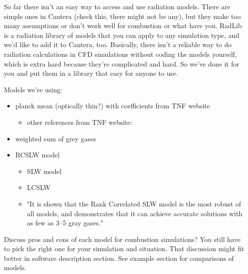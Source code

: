 \documentclass[preprint,12pt, a4paper]{elsarticle}
\begin{document}
So far there isn't an easy way to access and use radiation models. There are simple ones in Cantera (check this, there might not be any), but they make too many assumptions or don't work well for combustion or what have you. RadLib is a radiation library of models that you can apply to any simulation type, and we'd like to add it to Cantera, too. Basically, there isn't a reliable way to do radiation calculations in CFD simulations without coding the models yourself, which is extra hard because they're complicated and hard. So we've done it for you and put them in a library that easy for anyone to use.

Models we're using:
\begin{itemize}
 \item planck mean (optically thin?) with coefficients from TNF website \cite{Smith_2003}
 \begin{itemize}
  \item other references from TNF website: \cite{Grosshandler_1993,Frank_2000,Zhu_2002,Barlow_2001}
 \end{itemize}
 \item weighted sum of grey gases \cite{Bordbar_2014,Bordbar_2020}
 \item RCSLW model \cite{Solovjov_2017}
 \begin{itemize}
  \item SLW model \cite{Solovjov_2001}
  \item LCSLW \cite{Solovjov_2020}
  \item "It is shown that the Rank Correlated SLW model is the most robust of all models, and demonstrates that it can achieve accurate solutions with as few as 3–5 gray gases." \cite{Badger_2019}

 \end{itemize}  
\end{itemize}
Discuss pros and cons of each model for combustion simulations? You still have to pick the right one for your simulation and situation. That discussion might fit better in software description section. See example section for comparisons of models. 

\end{document}

